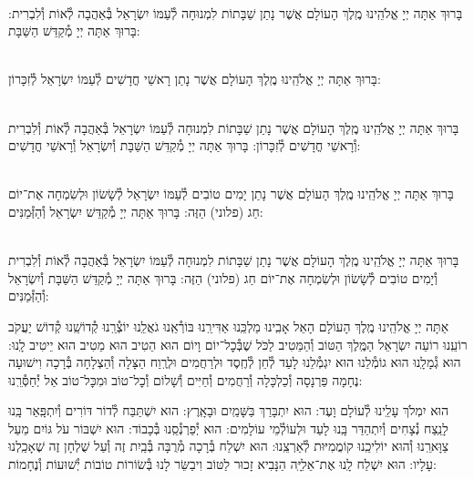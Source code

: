 \documentclass[twoside, openany, parskip=half, 11pt]{book}
\begin{document}
\begin{sometimes}

\\
בָּרוּךְ אַתָּה יְיָ אֱלֹהֵֽינוּ מֶֽלֶךְ הָעוֹלָם אֲשֶׁר נָתַן שַׁבָּתוֹת לִמְנוּחָה לְ֯עַמּוֹ יִשְׂרָאֵל בְּ֯אַהֲבָה
לְ֯אוֹת וְ֯לִבְרִית: בָּרוּךְ אַתָּה יְיָ מְ֯קַדֵּשׁ הַשַּׁבָּת:


\\
בָּרוּךְ אַתָּה יְיָ אֱלֹהֵֽינוּ מֶֽלֶךְ הָעוֹלָם
אֲשֶׁר נָתַן רָאשֵׁי חֳדָשִׁים לְ֯עַמּוֹ יִשְׂרָאֵל לְ֯זִכָּרוֹן:


\\
בָּרוּךְ אַתָּה יְיָ אֱלֹהֵֽינוּ מֶֽלֶךְ הָעוֹלָם
אֲשֶׁר נָתַן שַׁבָּתוֹת לִמְנוּחָה לְ֯עַמּוֹ יִשְׂרָאֵל בְּ֯אַהֲבָה לְ֯אוֹת וְ֯לִבְרִית וְ֯רָאשֵׁי חֳדָשִׁים לְ֯זִכָּרוֹן:
בָּרוּךְ אַתָּה יְיָ מְ֯קַדֵּשׁ הַשַּׁבָּת וְ֯יִשְׂרָאֵל וְ֯רָאשֵׁי חֳדָשִׁים:

\\
בָּרוּךְ אַתָּה יְיָ אֱלֹהֵֽינוּ מֶֽלֶךְ הָעוֹלָם
אֲשֶׁר נָתַן יָמִים טוֹבִים לְ֯עַמּוֹ יִשְׂרָאֵל
לְ֯שָׂשׂוֹן וּלְשִׂמְחָה אֶת־יוֹם חַג (פלוני) הַזֶּה:
בָּרוּךְ אַתָּה יְיָ מְ֯קַדֵּשׁ יִשְׂרָאֵל וְ֯הַזְּ֯מַנִּים:

\\
בָּרוּךְ אַתָּה יְיָ אֱלֹהֵֽינוּ מֶֽלֶךְ הָעוֹלָם אֲשֶׁר נָתַן שַׁבָּתוֹת לִמְנוּחָה לְ֯עַמּוֹ יִשְׂרָאֵל בְּ֯אַהֲבָה לְ֯אוֹת וְ֯לִבְרִית
וְ֯יָמִים טוֹבִים לְ֯שָׂשׂוֹן וּלְשִׂמְחָה אֶת־יוֹם חַג (פלוני) הַזֶּה:
בָּרוּךְ אַתָּה יְיָ מְ֯קַדֵּשׁ הַשַּׁבָּת וְ֯יִשְׂרָאֵל וְ֯הַזְּ֯מַנִּים:

\end{sometimes}


אַתָּה יְיָ אֱלֹהֵֽינוּ מֶֽלֶךְ הָעוֹלָם הָאֵל אָבִֽינוּ מַלְכֵּֽנוּ אַדִּירֵֽנוּ בּוֹרְ֯אֵֽנוּ גֹאֲלֵֽנוּ יוֹצְ֯רֵֽנוּ קְ֯דוֹשֵֽׁנוּ קְ֯דוֹשׁ יַעֲקֹב רוֹעֵֽנוּ רוֹעֵה יִשְׂרָאֵל הַמֶּֽלֶךְ הַטּוֹב וְ֯הַמֵּטִיב לַכֹּל שֶׁבְּ֯כׇל־יוֹם וָיוֹם הוּא הֵטִיב הוּא מֵטִיב הוּא יֵיטִיב לָֽנוּ: הוּא גְ֯מָלָֽנוּ הוּא גוֹמְ֯לֵנוּ הוּא יִגְמְ֯לֵנוּ לָעַד לְ֯חֵן לְ֯חֶֽסֶד וּלְרַחֲמִים וּלְרֶֽוַח הַצָּלָה וְ֯הַצְלָחָה בְּ֯רָכָה וִישׁוּעָה נֶחָמָה פַּרְנָסָה וְ֯כַלְכָּלָה וְ֯רַחֲמִים וְ֯חַיִּים וְ֯שָׁלוֹם וְ֯כׇל־טוֹב וּמִכׇּל־טוֹב אַל יְ֯חַסְּ֯רֵֽנוּ:



הוּא יִמְלֹךְ עָלֵֽינוּ לְ֯עוֹלָם וָעֶד:
הוּא יִתְבָּרַךְ בַּשָּׁמַֽיִם וּבָאָֽרֶץ:
הוּא יִשְׁתַּבַּח לְ֯דוֹר דּוֹרִים וְ֯יִתְפָּֽאַר בָּֽנוּ לָנֵֽצַח נְ֯צָחִים
וְ֯יִתְהַדַּר בָּֽנוּ לָעַד וּלְעוֹלְ֯מֵי עוֹלָמִים:
הוּא יְ֯פַרְנְ֯סֵֽנוּ בְּ֯כָבוֹד:
הוּא יִשְׁבּוֹר עֹל גּוֹיִם מֵעַל צַוָּארֵֽנוּ וְ֯הוּא יוֹלִיכֵֽנוּ קוֹמֲמִיּוּת לְ֯אַרְצֵֽנוּ:
הוּא יִשְׁלַח בְּ֯רָכָה מְ֯רֻבָּה בְּ֯בַֽיִת זֶה וְ֯עַל שֻׁלְחָן זֶה שֶׁאָכַֽלְנוּ עָלָיו:
הוּא יִשְׁלַח לָֽנוּ אֶת־אֵלִיָּֽה הַנָּבִיא זָכוּר לַטּוֹב וִיבַשֵּׂר לָנוּ בְּ֯שׂוֹרוֹת טוֹבוֹת יְ֯שׁוּעוֹת וְ֯נֶחָמוֹת:
\end{document}
